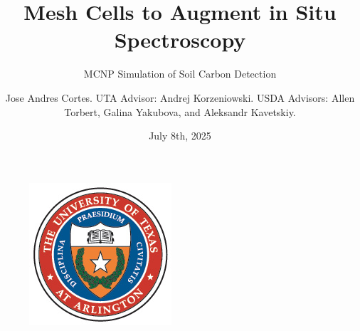 \documentclass[10pt,hyperref={colorlinks,citecolor=blue,urlcolor=peking_blue,linkcolor=}]{beamer}
\author[Jose Andres Cortes]{Jose Andres Cortes. UTA Advisor: Andrej Korzeniowski. USDA Advisors: Allen Torbert, Galina Yakubova, and Aleksandr Kavetskiy.}
\title{Mesh Cells to Augment in Situ Spectroscopy}
\subtitle{MCNP Simulation of Soil Carbon Detection}
\institute{UT Arlington, USDA-ARS}
\date{July 8th, 2025}
\theoremstyle{plain}
\newif\ifplacelogo %
\begin{document}
{
\begin{frame}
    \titlepage
    \begin{figure}[htpb]
        \begin{center}
            \includegraphics[width=0.2\linewidth]{../Figures/Misc/UTASeal.png}
        \end{center}
    \end{figure}
\end{frame}
}

\placelogofalse
\end{document}
